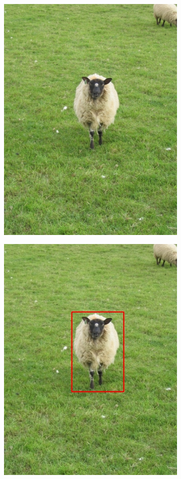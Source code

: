 \documentclass[a4paper,11]{article}
\begin{document}
\begin{center}
\begin{figure}[H]
   \begin{subfigure}{0.33\textwidth}
      \centering
      \includegraphics[width=0.9\linewidth]{images/sheep}
    \end{subfigure}
    \begin{subfigure}{.33\textwidth}
      \centering
      \includegraphics[width=0.9\linewidth]{results/input/sheep}

\end{subfigure}
\end{figure}
\end{center}
\end{document}
